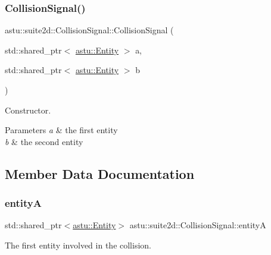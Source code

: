 \subsubsection{\texorpdfstring{Collision\+Signal()}{CollisionSignal()}}
{\footnotesize\ttfamily astu\+::suite2d\+::\+Collision\+Signal\+::\+Collision\+Signal (\begin{DoxyParamCaption}\item[{std\+::shared\+\_\+ptr$<$ \hyperlink{classastu_1_1Entity}{astu\+::\+Entity} $>$}]{a,  }\item[{std\+::shared\+\_\+ptr$<$ \hyperlink{classastu_1_1Entity}{astu\+::\+Entity} $>$}]{b }\end{DoxyParamCaption})\hspace{0.3cm}{\ttfamily [inline]}}

Constructor.


\begin{DoxyParams}{Parameters}
{\em a} & the first entity \\
\hline
{\em b} & the second entity \\
\hline
\end{DoxyParams}


\subsection{Member Data Documentation}
\mbox{\label{classastu_1_1suite2d_1_1CollisionSignal_a7ace89d8dca0c0b38e74d8bd04ecead1}} 
\subsubsection{\texorpdfstring{entityA}{entityA}}
{\footnotesize\ttfamily std\+::shared\+\_\+ptr$<$\hyperlink{classastu_1_1Entity}{astu\+::\+Entity}$>$ astu\+::suite2d\+::\+Collision\+Signal\+::entityA}

The first entity involved in the collision. \mbox{\label{classastu_1_1suite2d_1_1CollisionSignal_a5a68c5c6df677411bcc8a30a1df8b53b}} 
